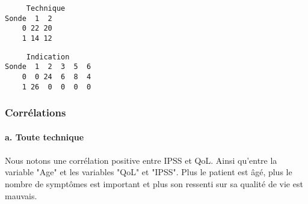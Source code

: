 \documentclass[11pt]{article}
\begin{document}
    \begin{center}
    \end{center}
    
    
    \begin{center}
    \end{center}
    
    
    \begin{center}
    \end{center}
    
    


    
    \begin{verbatim}
     Technique
Sonde  1  2
    0 22 20
    1 14 12
    \end{verbatim}

    
    
    \begin{verbatim}
     Indication
Sonde  1  2  3  5  6
    0  0 24  6  8  4
    1 26  0  0  0  0
    \end{verbatim}

    
    \subsubsection{Corrélations}\label{corruxe9lations}

    \paragraph{a. Toute technique}\label{a.-toute-technique}



    \begin{center}
    \end{center}
    
\paragraph{}
Nous notons une corrélation positive entre IPSS et QoL. Ainsi qu'entre
la variable "Age" et les variables "QoL" et "IPSS". Plus le patient est
âgé, plus le nombre de symptômes est important et plus son ressenti sur
sa qualité de vie est mauvais.
\end{document}
